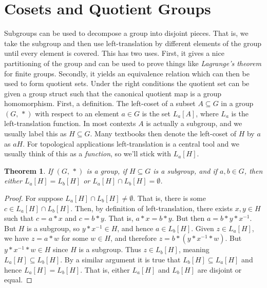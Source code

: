 \documentclass{article}
\theoremstyle{plain}
\newtheorem{theorem}{Theorem}[section]
\theoremstyle{normal}
\newenvironment{definition}{%
    \pushQED{\qed}\renewcommand{\qedsymbol}{$\blacksquare$}\definitionx%
}{%
    \popQED\enddefinitionx%
}
\begin{document}
        \section{Cosets and Quotient Groups}
            Subgroups can be used to decompose a group into disjoint pieces.
            That is, we take the subgroup and then use left-translation by
            different elements of the group until every element is covered.
            This has two uses. First, it gives a nice partitioning of the group
            and can be used to prove things like \textit{Lagrange's theorem}
            for finite groups. Secondly, it yields an equivalence relation
            which can then be used to form quotient sets. Under the right
            conditions the quotient set can be given a group struct such that
            the canonical quotient map is a group homomorphism. First, a
            definition.
            \begin{definition}[\textbf{Left-Coset in a Group}]
                The left-coset of a subset $A\subseteq{G}$ in a group
                $(G,\,*)$ with respect to an element $a\in{G}$ is the set
                $L_{a}[A]$, where $L_{a}$ is the left-translation function.
            \end{definition}
            In most contexts $A$ is actually a subgroup, and we usually label
            this as $H\subseteq{G}$. Many textbooks then denote the left-coset
            of $H$ by $a$ as $aH$. For topological applications
            left-translation is a central tool and we usually think of this as
            a \textit{function}, so we'll stick with $L_{a}[H]$.
            \begin{theorem}
                If $(G,\,*)$ is a group, if $H\subseteq{G}$ is a subgroup, and
                if $a,b\in{G}$, then either $L_{a}[H]=L_{b}[H]$ or
                $L_{a}[H]\cap{L}_{b}[H]=\emptyset$.
            \end{theorem}
            \begin{proof}
                For suppose $L_{a}[H]\cap{L}_{b}[H]\ne\emptyset$. That is,
                there is some $c\in{L}_{a}[H]\cap{L}_{b}[H]$. Then, by
                definition of left-translation, there exists $x,y\in{H}$ such
                that $c=a*x$ and $c=b*y$. That is, $a*x=b*y$. But then
                $a=b*y*x^{-1}$. But $H$ is a subgroup, so $y*x^{-1}\in{H}$, and
                hence $a\in{L}_{b}[H]$. Given $z\in{L}_{a}[H]$, we have
                $z=a*w$ for some $w\in{H}$, and therefore
                $z=b*(y*x^{-1}*w)$. But $y*x^{-1}*w\in{H}$ since $H$ is a
                subgroup. Thus $z\in{L}_{b}[H]$, meaning
                $L_{a}[H]\subseteq{L}_{b}[H]$. By a similar argument it is true
                that $L_{b}[H]\subseteq{L}_{a}[H]$ and hence
                $L_{a}[H]=L_{b}[H]$. That is, either $L_{a}[H]$ and $L_{b}[H]$
                are disjoint or equal.
            \end{proof}
\end{document}
